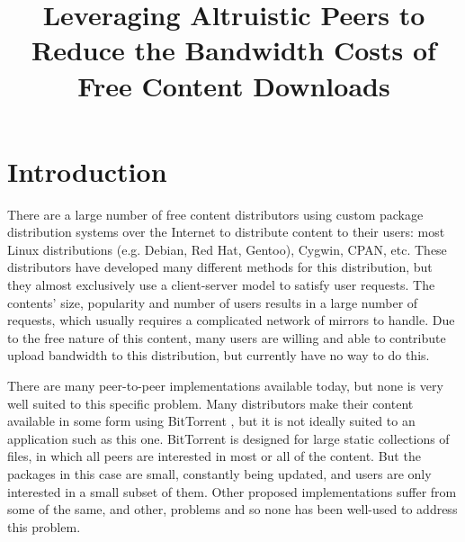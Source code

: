 \documentclass[conference]{IEEEtran}
\begin{document}
\title{Leveraging Altruistic Peers to Reduce the Bandwidth Costs of Free Content Downloads}
\author{
\and
{}
}

\maketitle

\section{Introduction}
\label{intro}

There are a large number of free content distributors using custom
package distribution systems over the Internet to distribute content
to their users: most Linux distributions (e.g. Debian, Red Hat,
Gentoo), Cygwin, CPAN, etc.
These distributors have developed many different
methods for this distribution, but they almost exclusively use a
client-server model to satisfy user requests. The contents' size,
popularity and number of users results in a large number of
requests, which usually requires a complicated network of mirrors to handle. Due
to the free nature of this content, many users are willing and able
to contribute upload bandwidth to this distribution, but currently
have no way to do this.

There are many peer-to-peer implementations available today, but
none is very well suited to this specific problem. Many distributors
make their content available in some form using BitTorrent \cite{COHEN03}, but it
is not ideally suited to an application such as this one. BitTorrent
is designed for large static collections of files, in which all
peers are interested in most or all of the content. But the packages
in this case are small, constantly being updated, and users are only
interested in a small subset of them. Other proposed implementations
suffer from some of the same, and other, problems and so none has
been well-used to address this problem.
\end{document}

